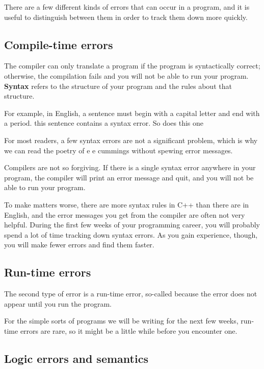 There are a few different kinds of errors that can occur
in a program, and it is useful to distinguish between them
in order to track them down more quickly.

\subsection{Compile-time errors}

The compiler can only translate a program if the program is
syntactically correct; otherwise, the compilation fails and
you will not be able to run your program.  {\bf Syntax}
refers to the structure of your program and the rules about
that structure.


For example, in English, a sentence must begin with a capital
letter and end with a period.  this sentence contains a syntax
error.  So does this one

For most readers, a few syntax errors are not a significant
problem, which is why we can read the poetry of e e cummings
without spewing error messages.

Compilers are not so forgiving.  If there is a single syntax
error anywhere in your program, the compiler will print an
error message and quit, and you will not be able to run
your program.

To make matters worse, there are more syntax rules in C++
than there are in English, and the error messages you get from
the compiler are often not very helpful.  During the first
few weeks of your programming career, you will probably
spend a lot of time tracking down syntax errors.  As you
gain experience, though, you will make fewer errors and find
them faster.

\subsection{Run-time errors}
\label{run-time}

The second type of error is a run-time error, so-called because
the error does not appear until you run the program.

For the simple sorts of programs we will be writing for the
next few weeks, run-time errors are rare, so it might be a little
while before you encounter one.


\subsection{Logic errors and semantics}

